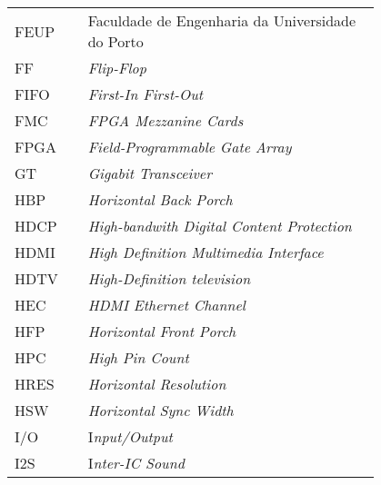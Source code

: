 \begin{flushleft}
\begin{longtable}{l p{0.8\linewidth}}
FEUP      & Faculdade de Engenharia da Universidade do Porto                                             \\
FF        & \textit{Flip-Flop }                                                                                   \\
FIFO      & \textit{First-In First-Out}                                                                           \\
FMC       & \textit{FPGA Mezzanine Cards}                                                                         \\
FPGA      & \textit{Field-Programmable Gate Array}                                                                \\
GT        & \textit{Gigabit Transceiver}                                                                          \\
HBP       & \textit{Horizontal Back Porch}                                                                        \\
HDCP      & \textit{High-bandwith Digital Content Protection }                                                    \\
HDMI      & \textit{High Definition Multimedia Interface}                                                         \\
HDTV      & \textit{High-Definition television}                                                                   \\
HEC       & \textit{HDMI Ethernet Channel }                                                                       \\
HFP       & \textit{Horizontal Front Porch}                                                                       \\
HPC       & \textit{High Pin Count}                                                                               \\
HRES      & \textit{Horizontal Resolution}                                                                        \\
HSW       & \textit{Horizontal Sync Width }                                                                       \\
I/O       & I\textit{nput/Output }                                                                                \\
I2S       & I\textit{nter-IC Sound }                                                                              \\

\end{longtable}
\end{flushleft}
